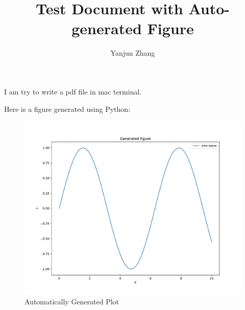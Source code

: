 \documentclass{article}
\begin{document}
\title{Test Document with Auto-generated Figure}
\author{Yanjun Zhang}
\maketitle

I am try to write a pdf file in mac terminal.

Here is a figure generated using Python:

\begin{figure}[h]
    \centering
    \includegraphics[width=0.7\linewidth]{figures/plot.pdf}
    \caption{Automatically Generated Plot}
\end{figure}
\end{document}

